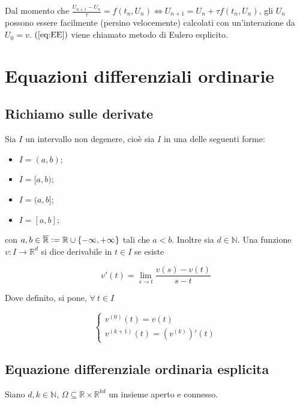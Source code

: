 \documentclass[hidelinks, 10pt]{report}
\begin{document}
Dal momento che $ \frac{U_{n + 1} - U_{n}}{\tau} = f(t_{n}, U_{n}) \iff U_{n + 1} = U_{n} + \tau f(t_{n}, U_{n}) $, gli $ U_{n} $ possono essere facilmente (persino velocemente) calcolati con un'interazione da $ U_{0} = v $. $ (\ref{eq:EE}) $ viene chiamato metodo di Eulero esplicito.

\section{Equazioni differenziali ordinarie}
\subsection{Richiamo sulle derivate}
Sia $ I $ un intervallo non degenere, cio\`e sia $ I $ in una delle seguenti forme:
\begin{itemize}
\item $ I = (a, b) $;
\item $ I = [a, b) $;
\item $ I = (a, b] $;
\item $ I = [a, b] $; 
\end{itemize}

con $ a, b \in \overline{\mathbb{R}} \vcentcolon= \mathbb{R} \cup \{ - \infty, + \infty \} $ tali che $ a < b $. Inoltre sia $ d \in \mathbb{N} $. Una funzione $ v: I \to \mathbb{R}^{d} $ si dice derivabile in $ t \in I $ se esiste

\[ v'(t) = \lim\limits_{s \to t} \frac{v(s) - v(t)}{s - t} \]

Dove definito, si pone, $ \forall\ t \in I $

\[
\begin{cases}
v^{(0)}(t) = v(t) \\
v^{(k + 1)}(t) = (v^{(k)})' (t) 
\end{cases}
\]

\subsection{Equazione differenziale ordinaria esplicita}
Siano $ d, k \in \mathbb{N} $, $ \Omega \subseteq \mathbb{R} \times \mathbb{R}^{kd} $ un insieme aperto e connesso.
\end{document}
